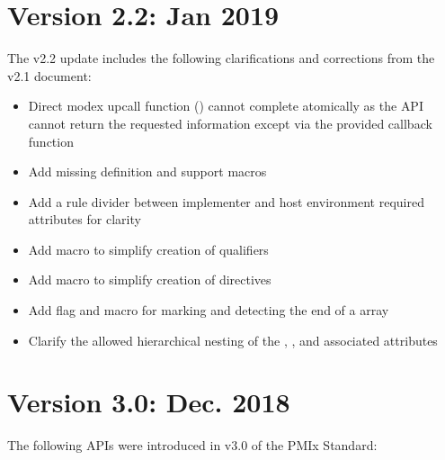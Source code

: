 \section{Version 2.2: Jan 2019}

The v2.2 update includes the following clarifications and corrections from the v2.1 document:

\begin{itemize}
    \item Direct modex upcall function () cannot complete atomically as the \ac{API} cannot return the requested information except via the provided callback function
    \item Add missing  definition and support macros
    \item Add a rule divider between implementer and host environment required attributes for clarity
    \item Add  macro to simplify creation of  qualifiers
    \item Add  macro to simplify creation of  directives
    \item Add flag and  macro for marking and detecting the end of a  array
    \item Clarify the allowed hierarchical nesting of the , , and associated attributes
\end{itemize}

\section{Version 3.0: Dec. 2018}

The following \acp{API} were introduced in v3.0 of the PMIx Standard:

